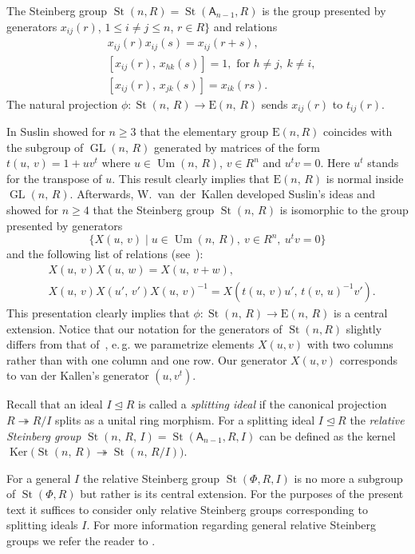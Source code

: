 \documentclass[11pt]{amsart}
\theoremstyle{plain} \declaretheorem[name=Theorem, Refname={Theorem,Theorems}]{tm} \Crefname{tm}{Theorem}{Theorems}
\numberwithin{equation}{section}
\theoremstyle{definition} \newtheorem{df}[lm]{Definition} \Crefname{df}{Definition}{Definitions}
\theoremstyle{remark} \newtheorem{rk}[lm]{Remark} \Crefname{rk}{Remark}{Remarks}
\newcommand{\Ker}{\mathop{\mathrm{Ker}}\nolimits}
\newcommand{\E}{{\mathrm{E}}}
\newcommand{\Um}{\mathop{\mathrm{Um}}\nolimits}
\newcommand{\St}{\mathop{\mathrm{St}}\nolimits}
\newcommand{\GL}{\mathop{\mathrm{GL}}\nolimits}
\newcommand{\epi}{\twoheadrightarrow}
\newcommand{\inv}{^{-1}}
\newcommand{\rA}{\mathsf{A}}
\begin{document}
The Steinberg group $\St(n, R) = \St(\rA_{n-1}, R)$ is the group presented by generators
$x_{ij}(r)$, $1\leq i\neq j\leq n$, $r\in R\}$ and relations
\setcounter{equation}{0}
\renewcommand{\theequation}{S\arabic{equation}}
\begin{align}
&x_{ij}(r)x_{ij}(s)=x_{ij}(r+s),\\
&[x_{ij}(r),\,x_{hk}(s)]=1,\text{ for }h\neq j,\ k\neq i,\\
&[x_{ij}(r),\,x_{jk}(s)]=x_{ik}(rs).
\end{align}
The natural projection $\phi\colon\St(n,\,R)\rightarrow\E(n,\,R)$ sends $x_{ij}(r)$ to $t_{ij}(r)$.

In \cite{Sus} Suslin showed for $n\geq 3$ that the elementary group $\E(n, R)$ coincides with the subgroup of $\GL(n,\,R)$ generated by matrices
of the form $t(u,\,v)=1+uv^t$ where $u\in\Um(n,\,R)$, $v\in R^n$ and $u^tv=0$. Here $u^t$ stands for the transpose of $u$.
This result clearly implies that $\E(n,\,R)$ is normal inside $\GL(n,\,R)$.
Afterwards, W.~van~der~Kallen developed Suslin's ideas and showed for $n\geq4$ that the Steinberg group $\St(n,\,R)$ is isomorphic to the group presented by generators
$$\{X(u,\,v)\mid u\in\Um(n,\,R),\ v\in R^n,\ u^tv=0\}$$ and the following list of relations (see~\cite[Theorem~1]{vdK}):
\setcounter{equation}{0} \renewcommand{\theequation}{K\arabic{equation}}
\begin{align}
&X(u,\,v)X(u,\,w)=X(u,\,v+w), \label{add1} \\
&X(u,\,v)X(u',\,v')X(u,\,v)\inv=X(t(u,\,v)u',\,t(v,\,u)\inv v'). \label{conj1}
\end{align}
This presentation clearly implies that $\phi\colon\St(n,\,R)\rightarrow\E(n,\,R)$ is a central extension.
Notice that our notation for the generators of $\St(n, R)$ slightly differs from that of~\cite{vdK}, e.\,g. we parametrize elements $X(u, v)$ with two columns
rather than with one column and one row. Our generator $X(u,v)$ corresponds to van der Kallen's generator $(u, v^t)$.

Recall that an ideal $I\trianglelefteq R$ is called a \emph{splitting ideal} if the canonical projection $R \twoheadrightarrow R/I$ splits as a unital ring morphism.
For a splitting ideal $I\trianglelefteq R$ the \emph{relative Steinberg group} $\St(n,\,R,\,I) = \St(\rA_{n-1}, R, I)$ can be defined as the kernel $\Ker\big(\St(n,\,R)\epi\St(n,\,R/I)\big)$.

For a general $I$ the relative Steinberg group $\St(\Phi, R, I)$ is no more a subgroup of $\St(\Phi, R)$ but rather is its central extension.
For the purposes of the present text it suffices to consider only relative Steinberg groups corresponding to splitting ideals $I$.
For more information regarding general relative Steinberg groups we refer the reader to \cite[Section~3]{SCh}.
\end{document}
